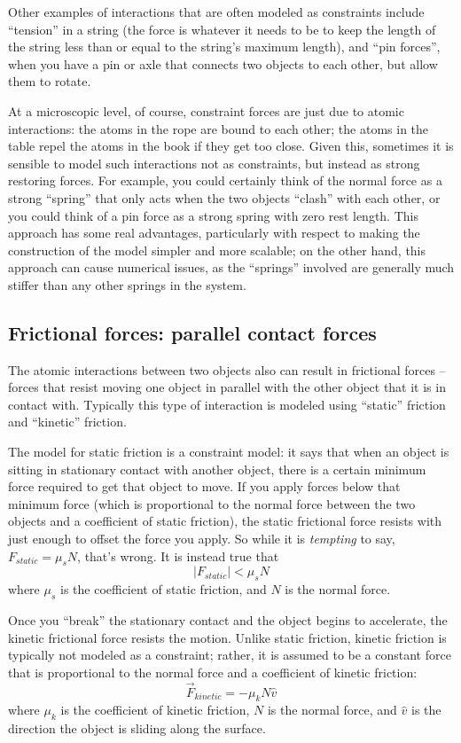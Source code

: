 \documentclass{tufte-handout}
\begin{document}
Other examples of interactions that are often modeled as constraints include ``tension'' in a string (the force is whatever it needs to be to keep the length of the string less than or equal to the string's maximum length), and ``pin forces'', when you have a pin or axle that connects two objects to each other, but allow them to rotate.  

At a microscopic level, of course, constraint forces are just due to atomic interactions:  the atoms in the rope are bound to each other; the atoms in the table repel the atoms in the book if they get too close.  Given this, sometimes it is sensible to model such interactions not as constraints, but instead as strong restoring forces.  For example, you could certainly think of the normal force as a strong ``spring'' that only acts when the two objects ``clash'' with each other, or you could think of a pin force as a strong spring with zero rest length. This approach has some real advantages, particularly with respect to making the construction of the model simpler and more scalable; on the other hand, this approach can cause numerical issues, as the ``springs'' involved are generally much stiffer than any other springs in the system.

\subsection{Frictional forces: parallel contact forces}
The atomic interactions between two objects also can result in frictional forces -- forces that resist moving one object in parallel with the other object that it is in contact with.  Typically this type of interaction is modeled using ``static'' friction and ``kinetic'' friction.

The model for static friction is a constraint model:  it says that when an object is sitting in stationary contact with another object, there is a certain minimum force required to get that object to move.  If you apply forces below that minimum force (which is proportional to the normal force between the two objects and a coefficient of static friction), the static frictional force resists with just enough to offset the force you apply. So while it is {\it tempting} to say, $F_{static} = \mu_s N$, that's wrong.  It is instead true that $$|F_{static}| < \mu_s N$$
where $\mu_s$ is the coefficient of static friction, and $N$ is the normal force.

Once you ``break'' the stationary contact and the object begins to accelerate, the kinetic frictional force resists the motion.  Unlike static friction, kinetic friction is typically not modeled as a constraint; rather, it is assumed to be a constant force that is proportional to the normal force and a coefficient of kinetic friction:
$$\vec{F}_{kinetic} = - \mu_k N \hat{v}$$
where $\mu_k$ is the coefficient of kinetic friction, $N$ is the normal force, and $\hat{v}$ is the direction the object is sliding along the surface.
\end{document}

